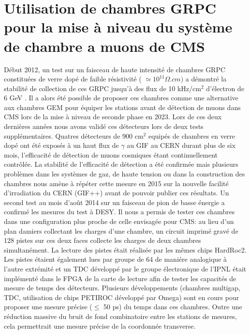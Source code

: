 \documentclass[11pt,french]{article}
\begin{document}
\section*{Utilisation de chambres GRPC pour la mise \`a niveau du syst\`eme de chambre a muons de CMS}

D\'ebut 2012, un test sur un faisceau de haute intensit\'e de chambres GRPC constitu\'ees de verre dop\'e de faible r\'esistivit\'e ( $ \simeq 10^{11} \Omega.cm) $ a d\'emontr\'e la stabilit\'e de collection de ces GRPC jusqu'\`a des flux de 10 kHz/cm$^2$ d'\'electron de 6 GeV \cite{desy}. Il a alors \'et\'e possible de proposer ces chambres comme une alternative aux chambres GEM pour \'equiper les stations avant de d\'etection de muons dans CMS lors de la mise \`a niveau de seconde phase en 2023. Lors de ces deux derni\`eres ann\'ees nous avons valid\'e ces d\'etecteurs lors de deux tests suppl\'ementaires. Quatres d\'etecteurs de 900 cm$^2$ equip\'es de chambres en verre dop\'e ont \'et\'e expos\'es \`a un haut flux de $\gamma$ au GIF au CERN durant plus de six mois, l'efficacit\'e de d\'etection de muons cosmiques \'etant continuellement contr\^ol\'ee. La stabilit\'e de l'efficacit\'e de d\'etection a \'et\'e confirm\'ee mais plusieurs probl\`emes dans les syst\`emes de gaz, de haute tension ou dans la construction des chambres nous am\`ene \`a r\'ep\'eter cette mesure en 2015 sur la nouvelle facilit\'e d'irradiation du CERN (GIF++) avant de pouvoir publier ces r\'esultats. Un second test au mois d'ao\^ut 2014 sur un faisceau de pion de basse \'energie a confirm\'e les mesures du test \`a DESY. Il nous a permis de tester ces chambres dans une configuration plus proche de celle envisag\'ee pour CMS: au lieu d'un plan damiers collectant les charges d'une chambre, un circuit imprim\'e grav\'e de 128 pistes sur ces deux faces collecte les charges de deux chambres simultan\'ement. La lecture des pistes \'etait r\'ealis\'ee par les m\^emes chips HardRoc2. Les pistes \'etaient \'egalement lues par groupe de 64 de mani\'ere analogique \`a l'autre extr\'emit\'e et un TDC d\'evelopp\'e par le groupe \'electronique de l'IPNL \'etait impl\'ement\'e dans le FPGA de la carte de lecture afin de tester les capacit\'es  de mesure de temps des d\'etecteurs. Plusieurs d\'eveloppements (chambres multigap, TDC, utilisation de chips PETIROC d\'evelopp\'e par Omega) sont en cours pour proposer une mesure pr\'ecise ($\le$ 50 ps) du temps dans ces chambres. Outre une r\'eduction massive du bruit de fond combinatoire entre les stations de mesures, cela permettrait une mesure pr\'ecise de la coordonn\'ee transverse.            
\end{document}
